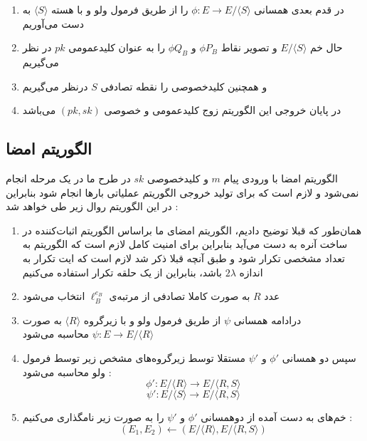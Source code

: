 \begin{itemize}
\begin{enumerate}
	\item {
	در قدم بعدی همسانی
	$\phi : E \rightarrow E/ \langle S \rangle$
	را از طریق فرمول ولو و با هسته
	$\langle S \rangle$
	به دست می‌آوریم
	}

	\item {
	حال خم 
	$E/ \langle S \rangle$
	و تصویر نقاط 
	$\phi{P_B}$
	و
	$\phi{Q_B}$
	را به عنوان کلیدعمومی
	$pk$
	در نظر می‌گیریم
	}

	\item {
	و همچنین کلیدخصوصی را نقطه تصادفی
	$S$
	درنظر می‌گیریم
	}

	\item {
	در پایان خروجی این الگوریتم زوج کلیدعمومی و خصوصی 
	$(pk,sk)$
	می‌باشد
	}
\end{enumerate}

\subsection{الگوریتم امضا}\label{algorithm_sign}
الگوریتم امضا با ورودی پیام
$m$
و کلیدخصوصی 
$sk$
در طرح ما در یک مرحله انجام نمی‌شود و لازم است که برای تولید خروجی الگوریتم عملیاتی بارها انجام شود بنابراین در این الگوریتم روال زیر طی خواهد شد :
\begin{enumerate}
	\item {
	همان‌طور که قبلا توضیح دادیم، الگوریتم امضای ما براساس الگوریتم اثبات‌کننده در ساخت آنره به دست می‌آید بنابراین برای امنیت کامل لازم است که الگوریتم به تعداد مشخصی تکرار شود و طبق آنچه قبلا ذکر شد لازم است که ایت تکرار به اندازه
	$2\lambda$
	باشد، بنابراین از یک حلقه تکرار استفاده می‌کنیم
	}

	\item {
	 عدد  
	$R$
	به صورت کاملا تصادفی از مرتبه‌ی
	$\ell_B^{e_B}$
	 انتخاب می‌شود
	}

	\item {
	درادامه همسانی
	$\psi$
	از طریق فرمول ولو و با زیرگروه
	$\langle R \rangle$
	به صورت
	$\psi : E \rightarrow E/ \langle R \rangle $
	محاسبه می‌شود
	}

	\item {
	سپس دو همسانی
	 $\phi'$
	 و
	 $\psi '$
	 مستقلا توسط زیرگروه‌های مشخص زیر توسط فرمول ولو محاسبه می‌شود :
	 $$ \phi' : E/ \langle R \rangle \rightarrow E/ \langle R,S \rangle $$
	 $$ \psi' :  E/ \langle S \rangle  \rightarrow E/ \langle R,S \rangle $$
	}

	\item {
	خم‌های به دست آمده از دوهمسانی 
	$\phi'$
	و
	 $\psi '$
	 را به صورت زیر نامگذاری می‌کنیم :
	 $$ (E_1,E_2) \leftarrow (E/ \langle R \rangle ,  E/ \langle R,S \rangle) $$
	}


\end{enumerate}
\end{itemize}
